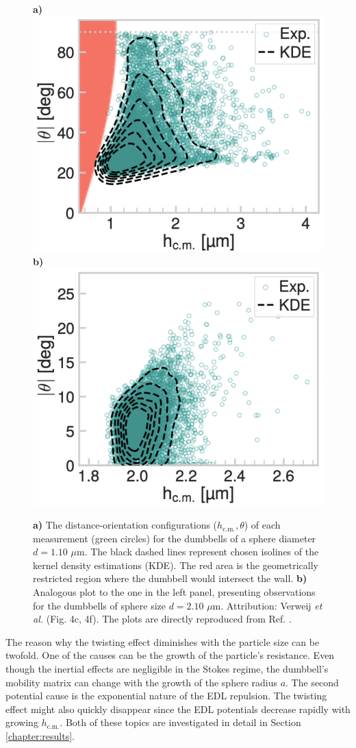 \documentclass{master_thesis}
\begin{document}
\begin{figure}
    \begin{minipage}{\linewidth}
         \centering
         \textbf{a)}
         \includegraphics[width=0.45\linewidth,valign=t]{figures/small_dumbbells_KDE.png}
         \textbf{b)}
         \includegraphics[width=0.45\linewidth,valign=t]{figures/big_dumbbells_KDE.png}
    \end{minipage}
    \caption{
    \textbf{a)} The distance-orientation configurations ($h_{\textrm{c.m.}}, \theta$) of each measurement (green circles) for the dumbbells of a sphere diameter $d=1.10$ $\mu$m. The black dashed lines represent chosen isolines of the kernel density estimations (KDE). The red area is the geometrically restricted region where the dumbbell would intersect the wall.  \textbf{b)} Analogous plot to the one in the left panel, presenting observations for the dumbbells of sphere size $d=2.10$ $\mu$m. Attribution: Verweij \textit{et al.} \cite{verweij2021} (Fig. 4c, 4f). The plots are directly reproduced from Ref. \cite{verweij2021}.
    }
\label{fig:dumbbell_KDEs}
\end{figure}

The reason why the twisting effect diminishes with the particle size can be twofold. One of the causes can be the growth of the particle's resistance. Even though the inertial effects are negligible in the Stokes regime, the dumbbell's mobility matrix can change with the growth of the sphere radius $a$. The second potential cause is the exponential nature of the EDL repulsion. The twisting effect might also quickly disappear since the EDL potentials decrease rapidly with growing $h_{\textrm{c.m.}}$. Both of these topics are investigated in detail in Section \ref{chapter:results}.
\end{document}
